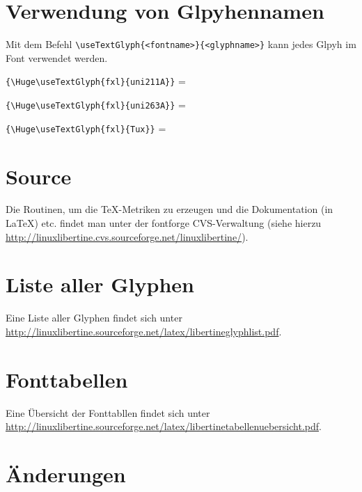 \section{Verwendung von Glpyhennamen}

Mit dem Befehl \verb|\useTextGlyph{<fontname>}{<glyphname>}| kann jedes Glpyh im Font
verwendet werden.


\verb|{\Huge\useTextGlyph{fxl}{uni211A}}| = {\Huge{}} \par
\verb|{\Huge\useTextGlyph{fxl}{uni263A}}| = {\Huge{}} \par
\verb|{\Huge\useTextGlyph{fxl}{Tux}}| = {\Huge{}} \par


\section{Source}

Die Routinen, um die \TeX-Metriken zu erzeugen und die Dokumentation (in \LaTeX) etc. findet man unter der fontforge CVS-Verwaltung (siehe hierzu \url{http://linuxlibertine.cvs.sourceforge.net/linuxlibertine/}).

\section{Liste aller Glyphen}

Eine Liste aller Glyphen findet sich unter\\
\url{http://linuxlibertine.sourceforge.net/latex/libertineglyphlist.pdf}.

\section{Fonttabellen}

Eine Übersicht der Fonttabllen findet sich unter\\
\url{http://linuxlibertine.sourceforge.net/latex/libertinetabellenuebersicht.pdf}.

\section{Änderungen}

